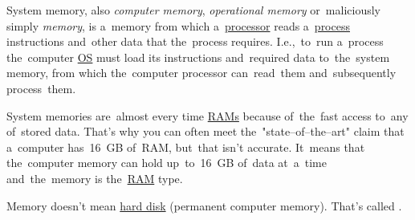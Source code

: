 \label{systemmemory}
System memory, also \textit{computer memory}, \textit{operational memory} or~maliciously simply \textit{memory}, is a~memory from which a~\hyperref[processorcpucore]{processor} reads a~\hyperref[applicationprocessprogramservicethread]{process} instructions and~other data that the~process requires.
I.e.,~to~run a~process the~computer \hyperref[os]{OS} must load its instructions and~required data to~the~system memory, from which the~computer processor can~read~them and~subsequently process~them.

System memories are~almost every time \hyperref[ram]{RAMs} because of~the~fast access to~any of~stored data.
That's why you can often meet the~"state--of--the--art" claim that a~computer has~16~GB of~RAM, but~that isn't accurate.
It~means that the~computer memory can hold up~to~16~GB of~data at~a~time and~the~memory is the~\hyperref[ram]{RAM} type.

\warning Memory doesn't mean \hyperref[harddiskdrive]{hard disk} (permanent computer memory).
That's called \hyperref[harddiskdrive]{}.
\newpage
